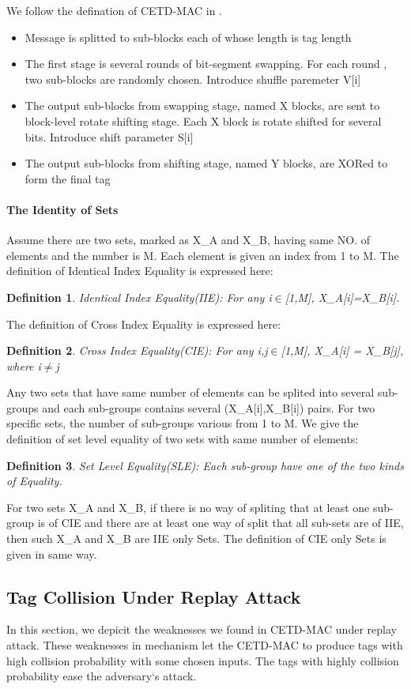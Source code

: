 \documentclass{article}
\newtheorem{defination}{Definition}[section]
\begin{document}
We follow the defination of CETD-MAC in \cite{keylist}. 
\begin{itemize}
	\item Message is splitted to sub-blocks each of whose length is tag length
	\item The first stage is several rounds of bit-segment swapping. For each round , two sub-blocks are randomly chosen. Introduce shuffle paremeter V[i]
	\item The output sub-blocks from swapping stage, named X blocks, are sent to block-level rotate shifting stage. Each X block is rotate shifted for several bits. Introduce shift parameter S[i]
	\item The output sub-blocks from shifting stage, named Y blocks, are XORed to form the final tag
\end{itemize}
\paragraph{The Identity of Sets}
Assume there are two sets, marked as X\_A and X\_B, having same NO. of elements and the number is M. Each element is given an index from 1 to M. The definition of Identical Index Equality is expressed here:
\begin{defination}
Identical Index Equality(IIE): For any i$\in$[1,M], X\_A[i]=X\_B[i].
\end{defination}
The definition of Cross Index Equality is expressed here:
\begin{defination}
Cross Index Equality(CIE): For any i,j$\in$[1,M], X\_A[i] = X\_B[j], where i$\neq$j
\end{defination}

Any two sets that have same number of elements can be splited into several sub-groups and each sub-groups contains several (X\_A[i],X\_B[i]) pairs. For two specific sets, the number of sub-groups various from 1 to M. We give the definition of set level equality of two sets with same number of elements:
\begin{defination}
Set Level Equality(SLE): Each sub-group have one of the two kinds of Equality.
\end{defination}

For two sets X\_A and X\_B, if there is no way of spliting that at least one sub-group is of CIE and there are at least one way of split that all sub-sets are of IIE, then such X\_A and X\_B are IIE only Sets. 
The definition of CIE only Sets is given in same way.


\subsection{Tag Collision Under Replay Attack}
In this section, we depicit the weaknesses we found in CETD-MAC under replay attack. These weaknesses in mechanism let the CETD-MAC to produce tags with high collision probability with some chosen inputs. The tags with highly collision probability ease the adversary`s attack.
\end{document}
